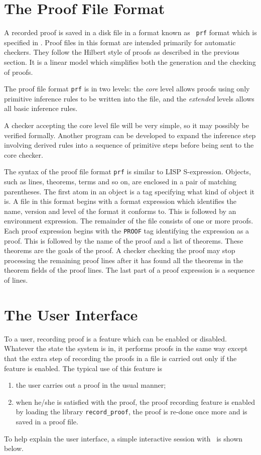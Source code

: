\section{The Proof File Format}

A recorded proof is saved in a disk file in a format known as {\tt
prf} format which is specified in \cite{WW:recordproof}. Proof files
in this format are intended primarily for automatic checkers. They
follow the Hilbert style of proofs as described in the previous
section. It is a linear model which simplifies both the generation and
the checking of proofs.

The proof file format {\tt prf} is in two levels: the {\it core} level
allows proofs using only primitive inference rules to be written into
the file, and the {\it extended\/} levels allows all basic inference rules.

A checker accepting the core level file will be very simple, so it may
possibly be verified formally. Another program can be developed to
expand the inference step involving derived rules into a sequence of
primitive steps before being sent to the core checker.

The syntax of the proof file format {\tt prf} is similar to LISP
S-expression.  Objects, such as lines, theorems, terms and so on, are
enclosed in a pair of matching parentheses. The first atom in an
object is a tag specifying what kind of object it is.  A file in this
format begins with a format expression which identifies the name, version
and level of the format it conforms to. This is followed by an
environment expression. The remainder of the file consists of one
or more proofs. Each proof expression begins with the {\tt PROOF} tag
identifying the expression as a proof. This is followed by the name of
the proof and a list of theorems. These theorems are the goals of the
proof. A checker checking the proof may stop processing the remaining proof
lines after it has found all the theorems in the theorem fields of the
proof lines. The last part of a proof expression is a sequence of lines.


\section{The User Interface}

To a user, recording proof is a feature which can be enabled or
disabled. Whatever the state the system is in, it performs proofs in
the same way except that the extra step of recording the proofs in a
file is carried out only if the feature is enabled. 
The typical use of this feature is
\begin{enumerate}
\item the user carries out a proof in the usual manner;
\item when he/she is satisfied with the proof, the proof recording
feature is enabled by loading the library {\tt record\_proof},
the proof is re-done once more and is saved in a proof file.
\end{enumerate}
To help explain the user interface, a simple interactive session with
\HOL\ is shown below.

